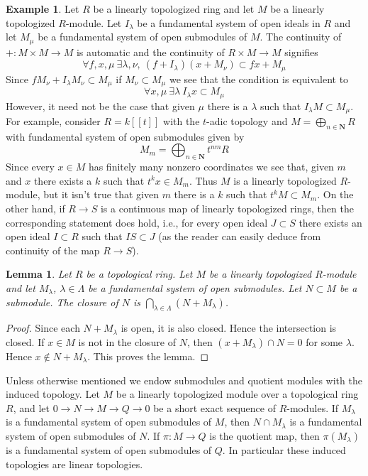 \documentclass{stacks-project}
\theoremstyle{plain}
\newtheorem{lemma}[subsection]{Lemma}
\theoremstyle{definition}
\newtheorem{example}[subsection]{Example}
\theoremstyle{remark}
\numberwithin{equation}{subsection}
\begin{document}
\begin{example}
\label{example-what-does-it-mean}
Let $R$ be a linearly topologized ring and let $M$ be a linearly
topologized $R$-module. Let $I_\lambda$ be a fundamental system of
open ideals in $R$ and let $M_\mu$ be a fundamental system of
open submodules of $M$. The continuity of $+ : M \times M \to M$
is automatic and the continuity of $R \times M \to M$ signifies
$$
\forall f, x, \mu\ \exists \lambda, \nu,\ (f + I_\lambda)(x + M_\nu)
\subset fx + M_\mu
$$
Since $fM_\nu + I_\lambda M_\nu \subset M_\mu$ if
$M_\nu \subset M_\mu$ we see that the condition is equivalent to
$$
\forall x, \mu\ \exists \lambda\ I_\lambda x \subset M_\mu
$$
However, it need not be the case that given $\mu$ there is a $\lambda$
such that $I_\lambda M \subset M_\mu$. For example, consider
$R = k[[t]]$ with the $t$-adic topology and
$M = \bigoplus_{n \in \mathbf{N}} R$ with fundamental system of
open submodules given by
$$
M_m = \bigoplus\nolimits_{n \in \mathbf{N}} t^{nm}R
$$
Since every $x \in M$ has finitely many nonzero coordinates we see
that, given $m$ and $x$ there exists a $k$ such that $t^k x \in M_m$.
Thus $M$ is a linearly topologized $R$-module, but it isn't true
that given $m$ there is a $k$ such that $t^kM \subset M_m$.
On the other hand, if $R \to S$ is a continuous map of linearly
topologized rings, then the corresponding statement does hold, i.e.,
for every open ideal $J \subset S$ there exists an open ideal
$I \subset R$ such that $IS \subset J$ (as the reader can easily
deduce from continuity of the map $R \to S$).
\end{example}

\begin{lemma}
\label{lemma-closed}
Let $R$ be a topological ring. Let $M$ be a linearly topologized
$R$-module and let $M_\lambda$, $\lambda \in \Lambda$ be a fundamental
system of open submodules. Let $N \subset M$ be a submodule.
The closure of $N$ is $\bigcap_{\lambda \in \Lambda} (N + M_\lambda)$.
\end{lemma}

\begin{proof}
Since each $N + M_\lambda$ is open, it is also closed. Hence the
intersection is closed. If $x \in M$ is not in the closure of $N$,
then $(x + M_\lambda) \cap N = 0$ for some $\lambda$. Hence
$x \not \in N + M_\lambda$. This proves the lemma.
\end{proof}

\noindent
Unless otherwise mentioned we endow submodules and quotient modules
with the induced topology. Let $M$ be a linearly topologized module
over a topological ring $R$, and let $0 \to N \to M \to Q \to 0$
be a short exact sequence of $R$-modules. If $M_\lambda$ is a
fundamental system of open submodules of $M$, then
$N \cap M_\lambda$ is a fundamental system of open submodules of $N$.
If $\pi : M \to Q$ is the quotient map, then $\pi(M_\lambda)$ is a
fundamental system of open submodules of $Q$. In particular these induced
topologies are linear topologies.
\end{document}
